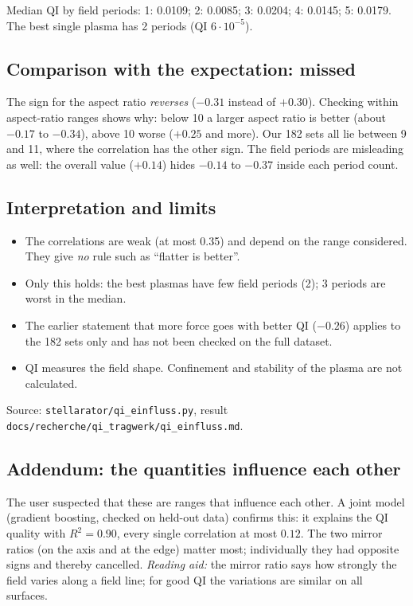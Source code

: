 \smallskip
\noindent Median QI by field periods: 1: 0.0109; 2: 0.0085; 3: 0.0204; 4: 0.0145; 5: 0.0179. The best single plasma has
2 periods (QI $6\cdot10^{-5}$).

\subsection*{Comparison with the expectation: missed}
The sign for the aspect ratio \emph{reverses} ($-0.31$ instead of $+0.30$). Checking within aspect-ratio ranges shows
why: below 10 a larger aspect ratio is better (about $-0.17$ to $-0.34$), above 10 worse ($+0.25$ and more). Our 182 sets
all lie between 9 and 11, where the correlation has the other sign. The field periods are misleading as well:
the overall value ($+0.14$) hides $-0.14$ to $-0.37$ inside each period count.

\subsection*{Interpretation and limits}
\begin{itemize}\itemsep1pt
\item The correlations are weak (at most 0.35) and depend on the range considered. They give \emph{no} rule such as
  ``flatter is better''.
\item Only this holds: the best plasmas have few field periods (2); 3 periods are worst in the median.
\item The earlier statement that more force goes with better QI ($-0.26$) applies to the 182 sets only and has not been
  checked on the full dataset.
\item QI measures the field shape. Confinement and stability of the plasma are not calculated.
\end{itemize}
Source: \texttt{stellarator/qi\_einfluss.py}, result \texttt{docs/recherche/qi\_tragwerk/qi\_einfluss.md}.

\subsection*{Addendum: the quantities influence each other}
The user suspected that these are ranges that influence each other. A joint model (gradient boosting, checked on held-out
data) confirms this: it explains the QI quality with $R^2=0.90$, every single correlation at most $0.12$. The two mirror
ratios (on the axis and at the edge) matter most; individually they had opposite signs and thereby cancelled.
\emph{Reading aid:} the mirror ratio says how strongly the field varies along a field line; for good QI the
variations are similar on all surfaces.

